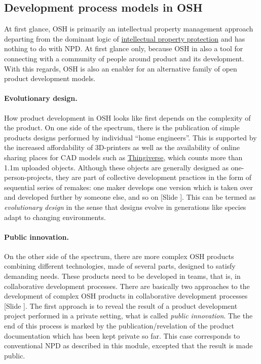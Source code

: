 \documentclass{article}
\newcounter{slide}
\begin{document}
\subsection{Development process models in OSH}
\label{sec:dvppractices}

At first glance, OSH is primarily an intellectual property management approach departing from the dominant logic of \href{https://en.wikipedia.org/wiki/Intellectual_property}{intellectual property protection} and has nothing to do with NPD. At first glance only, because OSH in also a tool for connecting with a community of people around product and its development. With this regards, OSH is also an enabler for an alternative family of open product development models. 

\paragraph{Evolutionary design.}How product development in OSH looks like first depends on the complexity of the product. On one side of the spectrum, there is the publication of simple products designs performed by individual ``home engineers''. This is supported by the increased affordability of 3D-printers as well as the availability of online sharing places for CAD models such as \href{http://thingiverse.com/}{Thingiverse}, which counts more than 1.1m uploaded objects. Although these objects are generally designed as one-person-projects, they are part of collective development practices in the form of sequential series of remakes: one maker develops one version which is taken over and developed further by someone else, and so on \cite{kyriakouKnowledgeReuseCustomization2017}{\color{blue}[Slide ]}. This can be termed as \emph{evolutionary design} in the sense that designs evolve in generations like species adapt to changing environments. 

\paragraph{Public innovation.}On the other side of the spectrum, there are more complex OSH products combining different technologies, made of several parts, designed to satisfy demanding needs. These products need to be developed in teams, that is, in collaborative development processes. There are basically two approaches to the development of complex OSH products in collaborative development processes {\color{blue}[Slide ]}. The first approach is to reveal the result of a product development project performed in a private setting, what is called \emph{public innovation}. The the end of this process is marked by the publication/revelation of the product documentation which has been kept private so far. This case corresponds to conventional NPD as described in this module, excepted that the result is made public. 
\end{document}
